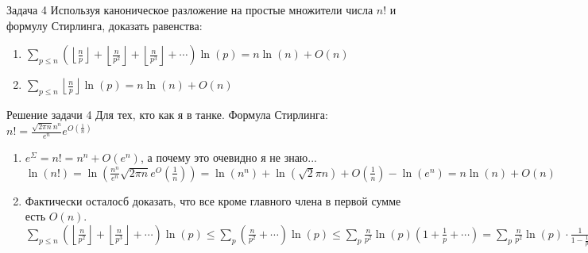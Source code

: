 \documentclass[a4paper,12pt]{article}
\newcommand{\SL}{\sum\limits}
\newcommand{\os}{\left(}
\newcommand{\cs}{\right)}
\begin{document}
\begin{mybox}{}
\begin{task}{Задача 4}
Используя каноническое разложение на простые множители числа $n!$ и формулу
Стирлинга, доказать равенства:
\begin{enumerate}
\item $\SL_{p\le n}\os\left\lfloor\frac{n}{p}\right\rfloor + \left\lfloor\frac{n}{p^2}\right\rfloor + \left\lfloor\frac{n}{p^3}\right\rfloor + \cdots\cs\ln(p) =n\ln(n) + O(n) $
\item $\SL_{p\le n}\left\lfloor\frac{n}{p}\right\rfloor \ln(p) = n\ln(n) + O(n)$
\end{enumerate}
\end{task}

\begin{sol}{Решение задачи 4}
Для тех, кто как я в танке. Формула Стирлинга: $n! = \frac{\sqrt{2\pi n} n^n}{e^n} e^{O\os\frac{1}{n}\cs}$
\begin{enumerate}
\item  $e^\Sigma = n! = n^n + O(e^n)$, а почему это очевидно я не знаю...\\
$\ln(n!) =\ln(\frac{n^n}{e^n} \sqrt{2\pi n} e^O(\frac{1}{n})) = \ln(n^n) + \ln(\sqrt2\pi n) + O(\frac{1}{n}) - \ln(e^n) = n\ln(n) + O(n) $
\item Фактически осталосб доказать, что все кроме главного члена в первой сумме есть $O(n)$.\\
$\SL_{p\le n}\os\left\lfloor\frac{n}{p^2}\right\rfloor + \left\lfloor\frac{n}{p^3}\right\rfloor + \cdots\cs\ln(p) \le \SL_p\os \frac{n}{p^2} + \cdots  \cs \ln(p) \le \SL_p \frac{n}{p^2}\ln(p) \os 1 + \frac{1}{p} + \cdots \cs  = \SL_p \frac{n}{p^2}\ln(p) \cdot\frac{1}{1 - \frac{1}{p}}  = n\SL_{p\le n}\frac{\ln(p)}{p^2 - p} = O(n)$
\end{enumerate}
\end{sol}

\end{mybox}
\end{document}
